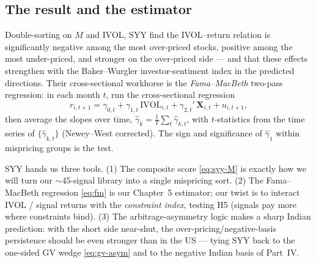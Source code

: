 \subsection*{The result and the estimator}
Double-sorting on $M$ and IVOL, SYY find the IVOL--return relation is significantly negative among the most over-priced stocks, positive among the most under-priced, and stronger on the over-priced side --- and that these effects strengthen with the Baker--Wurgler investor-sentiment index in the predicted directions. Their cross-sectional workhorse is the \emph{Fama--MacBeth} two-pass regression: in each month $t$, run the cross-sectional regression
\begin{equation}
r_{i,t+1} = \gamma_{0,t} + \gamma_{1,t}\,\mathrm{IVOL}_{i,t} + \gamma_{2,t}'\,\mathbf{X}_{i,t} + u_{i,t+1}, \label{eq:fm}
\end{equation}
then average the slopes over time, $\hat\gamma_k=\frac1T\sum_t\hat\gamma_{k,t}$, with $t$-statistics from the time series of $\{\hat\gamma_{k,t}\}$ (Newey--West corrected). The sign and significance of $\hat\gamma_1$ within mispricing groups is the test.

\begin{takeaway}
SYY hands us three tools. (1) The composite score \eqref{eq:syy-M} is exactly how we will turn our $\sim$45-signal library into a single mispricing sort. (2) The Fama--MacBeth regression \eqref{eq:fm} is our Chapter~5 estimator; our twist is to interact IVOL / signal returns with the \emph{constraint index}, testing H5 (signals pay more where constraints bind). (3) The arbitrage-asymmetry logic makes a sharp Indian prediction: with the short side near-shut, the over-pricing/negative-basis persistence should be even stronger than in the US --- tying SYY back to the one-sided GV wedge \eqref{eq:gv-asym} and to the negative Indian basis of Part~IV.
\end{takeaway}
